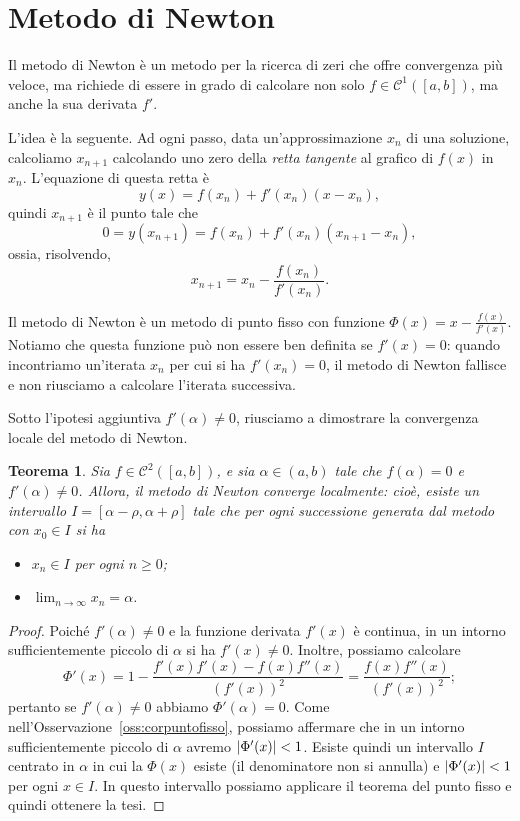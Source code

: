 \documentclass[a4paper]{report}
\DeclarePairedDelimiter{\abs}{\lvert}{\rvert}
\newtheorem{theorem}{Teorema}[chapter]
\theoremstyle{definiton}
\theoremstyle{remark}
\begin{document}
\section{Metodo di Newton}

Il metodo di Newton è un metodo per la ricerca di zeri che offre convergenza più veloce, ma richiede di essere in grado di calcolare non solo $f \in \mathcal{C}^1([a,b])$, ma anche la sua derivata $f'$.

L'idea è la seguente. Ad ogni passo, data un'approssimazione $x_n$ di una soluzione, calcoliamo $x_{n+1}$ calcolando uno zero della \emph{retta tangente} al grafico di $f(x)$ in $x_n$. L'equazione di questa retta è
\[
y(x) = f(x_n) + f'(x_n) (x- x_n),
\]
quindi $x_{n+1}$ è il punto tale che
\[
0 = y(x_{n+1}) = f(x_n) + f'(x_n) (x_{n+1}- x_n),
\]
ossia, risolvendo,
\[
x_{n+1} = x_n - \frac{f(x_n)}{f'(x_n)}.
\]

Il metodo di Newton è un metodo di punto fisso con funzione $\Phi(x) = x - \frac{f(x)}{f'(x)}$. Notiamo che questa funzione può non essere ben definita se $f'(x) = 0$: quando incontriamo un'iterata $x_n$ per cui si ha $f'(x_n) = 0$, il metodo di Newton fallisce e non riusciamo a calcolare l'iterata successiva.

Sotto l'ipotesi aggiuntiva $f'(\alpha) \neq 0$, riusciamo a dimostrare la convergenza locale del metodo di Newton.

\begin{theorem}
Sia $f \in \mathcal{C}^2([a,b])$, e sia $\alpha \in (a,b)$ tale che $f(\alpha) = 0$ e $f'(\alpha) \neq 0$. Allora, il metodo di Newton converge localmente: cioè, esiste un intervallo $I = [\alpha - \rho,\alpha + \rho]$ tale che per ogni successione generata dal metodo con $x_0 \in I$ si ha
\begin{itemize}
    \item $x_n \in I$ per ogni $n\geq 0$;
    \item $\lim_{n\to \infty } x_n = \alpha$.
\end{itemize}
\end{theorem}
\begin{proof}
Poiché $f'(\alpha) \neq 0$ e la funzione derivata $f'(x)$ è continua, in un intorno sufficientemente piccolo di $\alpha$ si ha $f'(x) \neq 0$. Inoltre, possiamo calcolare
\begin{equation} \label{Phiprime}
    \Phi'(x) = 1 - \frac{f'(x)f'(x) - f(x)f''(x)}{(f'(x))^2} = \frac{f(x)f''(x)}{(f'(x))^2};
\end{equation}
pertanto se $f'(\alpha) \neq 0$ abbiamo $\Phi'(\alpha) = 0$. Come nell'Osservazione~\ref{oss:corpuntofisso}, possiamo affermare che in un intorno sufficientemente piccolo di $\alpha$ avremo $\abs{\Phi'(x)} < 1$. Esiste quindi un intervallo $I$ centrato in $\alpha$ in cui la $\Phi(x)$ esiste (il denominatore non si annulla) e $\abs{\Phi'(x)} < 1$ per ogni $x\in I$. In questo intervallo possiamo applicare il teorema del punto fisso e quindi ottenere la tesi.
\end{proof}
\end{document}
